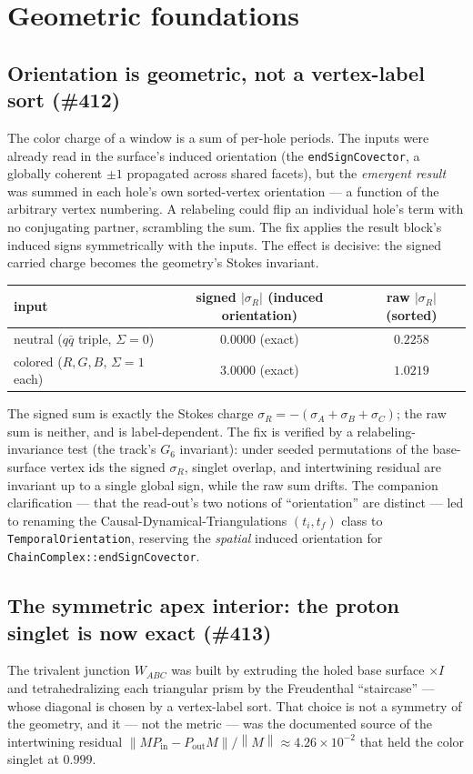 \documentclass[11pt]{article}
\newcommand{\norm}[1]{\left\lVert #1 \right\rVert}
\newcommand{\abs}[1]{\left\lvert #1 \right\rvert}
\newcommand{\sigmacol}{\sigma}
\newcommand{\Pin}{P_{\mathrm{in}}}
\newcommand{\Pout}{P_{\mathrm{out}}}
\begin{document}
\section{Geometric foundations}

\subsection{Orientation is geometric, not a vertex-label sort (\#412)}
\label{sec:orient}
The color charge of a window is a sum of per-hole periods. The inputs were already read
in the surface's induced orientation (the \texttt{endSignCovector}, a globally coherent
$\pm1$ propagated across shared facets), but the \emph{emergent result} was summed in
each hole's own sorted-vertex orientation --- a function of the arbitrary vertex
numbering. A relabeling could flip an individual hole's term with no conjugating partner,
scrambling the sum. The fix applies the result block's induced signs symmetrically with
the inputs. The effect is decisive: the signed carried charge becomes the geometry's
Stokes invariant.

\begin{center}
\small
\begin{tabular}{@{}lcc@{}}
\toprule
input & signed $\abs{\sigmacol_R}$ (induced orientation) & raw $\abs{\sigmacol_R}$ (sorted) \\
\midrule
neutral ($q\bar q$ triple, $\Sigma=0$) & $0.0000$ (exact) & $0.2258$\\
colored ($R,G,B$, $\Sigma=1$ each)     & $3.0000$ (exact) & $1.0219$\\
\bottomrule
\end{tabular}
\end{center}

\noindent The signed sum is exactly the Stokes charge $\sigmacol_R=-(\sigmacol_A+
\sigmacol_B+\sigmacol_C)$; the raw sum is neither, and is label-dependent. The fix is
verified by a relabeling-invariance test (the track's $G_6$ invariant): under seeded
permutations of the base-surface vertex ids the signed $\sigmacol_R$, singlet overlap,
and intertwining residual are invariant up to a single global sign, while the raw sum
drifts. The companion clarification --- that the read-out's two notions of
``orientation'' are distinct --- led to renaming the Causal-Dynamical-Triangulations
$(t_i,t_f)$ class to \texttt{TemporalOrientation}, reserving the \emph{spatial} induced
orientation for \texttt{ChainComplex::endSignCovector}.

\subsection{The symmetric apex interior: the proton singlet is now exact (\#413)}
\label{sec:apex}
The trivalent junction $W_{ABC}$ was built by extruding the holed base surface
$\times I$ and tetrahedralizing each triangular prism by the Freudenthal ``staircase'' ---
whose diagonal is chosen by a vertex-label sort. That choice is not a symmetry of the
geometry, and it --- not the metric --- was the documented source of the intertwining
residual $\norm{M\Pin-\Pout M}/\norm{M}\approx 4.26\times10^{-2}$ that held the color
singlet at $0.999$.
\end{document}
